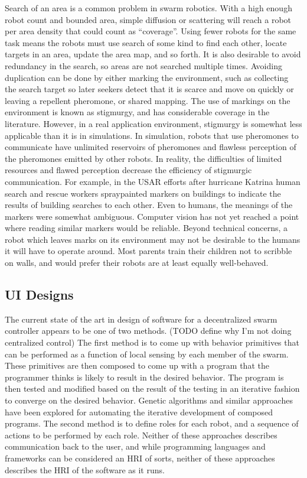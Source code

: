 \documentclass[]{article}
\begin{document}
Search of an area is a common problem in swarm robotics.
With a high enough robot count and bounded area, simple diffusion or scattering will reach a robot per area density that could count as ``coverage''. 
Using fewer robots for the same task means the robots must use search of some kind to find each other, locate targets in an area, update the area map, and so forth. 
It is also desirable to avoid redundancy in the search, so areas are not searched multiple times.
Avoiding duplication can be done by either marking the environment, such as collecting the search target so later seekers detect that it is scarce and move on quickly or leaving a repellent pheromone, or shared mapping.
The use of markings on the environment is known as stigmurgy, and has considerable coverage in the literature. 
However, in a real application environment, stigmurgy is somewhat less applicable than it is in simulations. 
In simulation, robots that use pheromones to communicate have unlimited reservoirs of pheromones and flawless perception of the pheromones emitted by other robots. 
In reality, the difficulties of limited resources and flawed perception decrease the efficiency of stigmurgic communication. 
For example, in the USAR efforts after hurricane Katrina human search and rescue workers spraypainted markers on buildings to indicate the results of building searches to each other. 
Even to humans, the meanings of the markers were somewhat ambiguous. 
Computer vision has not yet reached a point where reading similar markers would be reliable. 
Beyond technical concerns, a robot which leaves marks on its environment may not be desirable to the humans it will have to operate around. 
Most parents train their children not to scribble on walls, and would prefer their robots are at least equally well-behaved. 

\subsection{UI Designs}

The current state of the art in design of software for a decentralized swarm controller appears to be one of two methods. (TODO define why I'm not doing centralized control)
The first method is to come up with behavior primitives that can be performed as a function of local sensing by each member of the swarm. 
These primitives are then composed to come up with a program that the programmer thinks is likely to result in the desired behavior. 
The program is then tested and modified based on the result of the testing in an iterative fashion to converge on the desired behavior. 
Genetic algorithms and similar approaches have been explored for automating the iterative development of composed programs. 
The second method is to define roles for each robot, and a sequence of actions to be performed by each role. 
Neither of these approaches describes communication back to the user, and while programming languages and frameworks can be considered an HRI of sorts, neither of these approaches describes the HRI of the software as it runs. 
\end{document}
